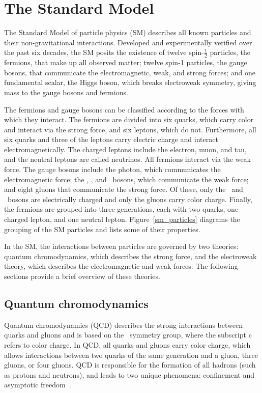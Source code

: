 \section{The Standard Model}
The Standard Model of particle physics (SM) describes all known particles and their non-gravitational interactions. Developed and experimentally verified over the past six decades, the SM posits the existence of twelve spin-$\frac{1}{2}$ particles, the fermions, that make up all observed matter; twelve spin-1 particles, the gauge bosons, that communicate the electromagnetic, weak, and strong forces; and one fundamental scalar, the Higgs boson, which breaks electroweak symmetry, giving mass to the gauge bosons and fermions.

The fermions and gauge bosons can be classified according to the forces with which they interact. The fermions are divided into six quarks, which carry color and interact via the strong force, and six leptons, which do not. Furthermore, all six quarks and three of the leptons carry electric charge and interact electromagnetically. The charged leptons include the electron, muon, and tau, and the neutral leptons are called neutrinos. All fermions interact via the weak force. The gauge bosons include the photon, which communicates the electromagnetic force; the \PWp, \PWm, and \cPZ\ bosons, which communicate the weak force; and eight gluons that communicate the strong force. Of these, only the \PWp\ and \PWm\ bosons are electrically charged and only the gluons carry color charge. Finally, the fermions are grouped into three generations, each with two quarks, one charged lepton, and one neutral lepton. Figure~\ref{sm_particles} diagrams the grouping of the SM particles and lists some of their properties.



In the SM, the interactions between particles are governed by two theories: quantum chromodynamics, which describes the strong force, and the electroweak theory, which describes the electromagnetic and weak forces. The following sections provide a brief overview of these theories.

\subsection{Quantum chromodynamics}
Quantum chromodynamics (QCD) describes the strong interactions between \linebreak[4]quarks and gluons and is based on the \suthreec\ symmetry group, where the subscript $\mathrm{c}$ refers to color charge. In QCD, all quarks and gluons carry color charge, which allows interactions between two quarks of the same generation and a gluon, three gluons, or four gluons. QCD is responsible for the formation of all hadrons (such as protons and neutrons), and leads to two unique phenomena: confinement and asymptotic freedom~\cite{gross_wilczek_73, qcd_73}.

